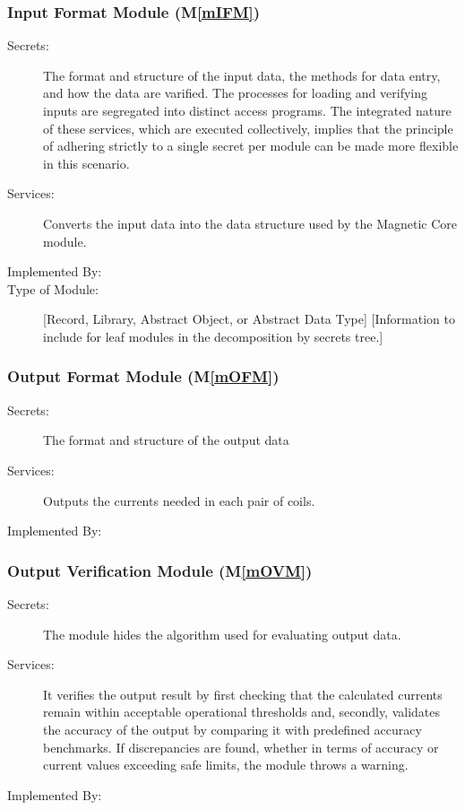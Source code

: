 \documentclass[12pt, titlepage]{article}
\newcommand{\mref}[1]{M\ref{#1}}
\begin{document}
\subsubsection{Input Format Module (\mref{mIFM})}

\begin{description}
\item[Secrets:]The format and structure of the input data, the methods for data entry, and how the data are varified. The processes for loading and verifying inputs are segregated into distinct access programs. The integrated nature of these services, which are executed collectively, implies that the principle of adhering strictly to a single secret per module can be made more flexible in this scenario.
\item[Services:]Converts the input data into the data structure used by the
  Magnetic Core module.
\item[Implemented By:] \progname 
\item[Type of Module:] [Record, Library, Abstract Object, or Abstract Data Type]
  [Information to include for leaf modules in the decomposition by secrets tree.]
\end{description}


\subsubsection{Output Format Module (\mref{mOFM})}

\begin{description}
\item[Secrets:]The format and structure of the output data
\item[Services:]Outputs the currents needed in each pair of coils.
\item[Implemented By:] \progname 
\end{description}

\subsubsection{Output Verification Module (\mref{mOVM})}

\begin{description}
\item[Secrets:]The module hides the algorithm used for evaluating output data.
\item[Services:]It verifies the output result by first checking that the calculated currents remain within acceptable operational thresholds and, secondly, validates the accuracy of the output by comparing it with predefined accuracy benchmarks. If discrepancies are found, whether in terms of accuracy or current values exceeding safe limits, the module throws a warning.
\item[Implemented By:] \progname 
\end{description}
\end{document}
